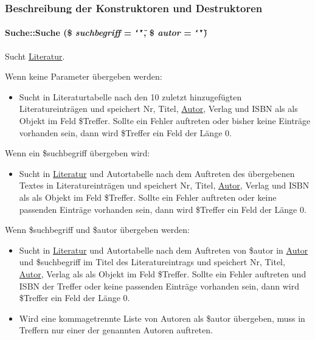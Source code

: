\subsubsection{Beschreibung der Konstruktoren und Destruktoren}
\hypertarget{classSuche_277cd59d3689d6f0875d114be0024935}{
\paragraph[Suche]{\setlength{\rightskip}{0pt plus 5cm}Suche::Suche (\$ {\em suchbegriff} = {\tt \char`\"{}\char`\"{}}, \$ {\em autor} = {\tt \char`\"{}\char`\"{}})}\hfill}
\label{classSuche_277cd59d3689d6f0875d114be0024935}


Sucht \hyperlink{classLiteratur}{Literatur}. 

Wenn keine Parameter übergeben werden:\begin{itemize}
\item Sucht in Literaturtabelle nach den 10 zuletzt hinzugefügten Literatureinträgen und speichert Nr, Titel, \hyperlink{classAutor}{Autor}, Verlag und ISBN als als Objekt im Feld \$Treffer. Sollte ein Fehler auftreten oder bisher keine Einträge vorhanden sein, dann wird \$Treffer ein Feld der Länge 0.\end{itemize}


Wenn ein \$suchbegriff übergeben wird:\begin{itemize}
\item Sucht in \hyperlink{classLiteratur}{Literatur} und Autortabelle nach dem Auftreten des übergebenen Textes in Literatureinträgen und speichert Nr, Titel, \hyperlink{classAutor}{Autor}, Verlag und ISBN als als Objekt im Feld \$Treffer. Sollte ein Fehler auftreten oder keine passenden Einträge vorhanden sein, dann wird \$Treffer ein Feld der Länge 0.\end{itemize}


Wenn \$suchbegriff und \$autor übergeben werden:\begin{itemize}
\item Sucht in \hyperlink{classLiteratur}{Literatur} und Autortabelle nach dem Auftreten von \$autor in \hyperlink{classAutor}{Autor} und \$suchbegriff im Titel des Literatureintrags und speichert Nr, Titel, \hyperlink{classAutor}{Autor}, Verlag als als Objekt im Feld \$Treffer. Sollte ein Fehler auftreten und ISBN der Treffer oder keine passenden Einträge vorhanden sein, dann wird \$Treffer ein Feld der Länge 0.\item Wird eine kommagetrennte Liste von Autoren als \$autor übergeben, muss in Treffern nur einer der genannten Autoren auftreten.\end{itemize}


